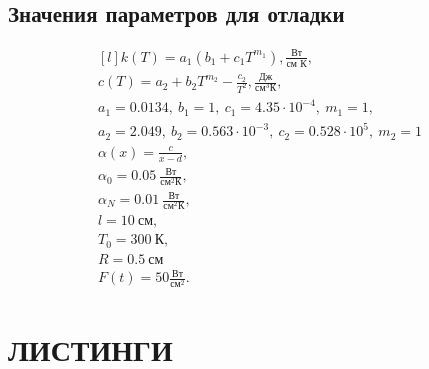 \subsection{Значения параметров для отладки}

\begin{equation*}
    \begin{matrix*}[l]
        k(T) = a_1(b_1 + c_1 T^{m_1}), \frac{\text{Вт}}{\text{см К}}, \\
        c(T) = a_2 + b_2 T^{m_2} - \frac{c_2}{T^2}, \frac{\text{Дж}}{\text{см}^3 \text{К}}, \\
        a_1 = 0.0134,\ b_1 = 1,\ c_1 = 4.35 \cdot 10^{-4},\ m_1=1, \\
        a_2 = 2.049,\ b_2 = 0.563 \cdot 10^{-3},\ c_2 = 0.528 \cdot 10^5,\ m_2 = 1 \\
        \alpha(x) = \frac{c}{x-d}, \\
        \alpha_0 = 0.05\ \frac{\text{Вт}}{\text{см}^2 \text{К}}, \\
        \alpha_N = 0.01\ \frac{\text{Вт}}{\text{см}^2 \text{К}}, \\
        l = 10\ \text{см}, \\
        T_0 = 300\ \text{К}, \\
        R = 0.5\ \text{см} \\
        F(t) = 50 \frac{\text{Вт}}{\text{см}^2}.
    \end{matrix*}
\end{equation*}

\section{ЛИСТИНГИ}
